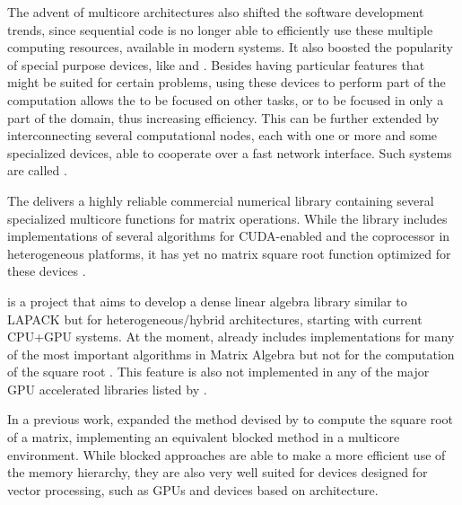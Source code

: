 \documentclass[../thesis]{subfiles}
\begin{document}
	The advent of multicore architectures also shifted the software development trends, since sequential code is no longer able to efficiently use these multiple computing resources, available in modern systems. It also boosted the popularity of special purpose devices, like \gpus and \dsps. Besides having particular features that might be suited for certain problems, using these devices to perform part of the computation allows the \cpu to be focused on other tasks, or to be focused in only a part of the domain, thus increasing efficiency. This can be further extended by interconnecting several computational nodes, each with one or more \cpus and some specialized devices, able to cooperate over a fast network interface. Such systems are called \hetplats.

	The \nag\cite{NAG} delivers a highly reliable commercial numerical library containing several specialized multicore functions for matrix operations. While the \nag library includes implementations of several algorithms for CUDA-enabled \gpus and the \intel\xeonphi coprocessor in heterogeneous platforms, it has yet no matrix square root function optimized for these devices \cite{NAG:GPU:0:6,NAG:MIC}.

	\magma is a project that aims to develop a dense linear algebra library similar to LAPACK but for heterogeneous/hybrid architectures, starting with current CPU+GPU systems. At the moment, \magma already includes implementations for many of the most important algorithms in Matrix Algebra but not for the computation of the square root \cite{PLASMA:MAGMA}. This feature is also not implemented in any of the major GPU accelerated libraries listed by \nvidia \cite{ACCELEREYES:WIKI:SQRTM,CULA:LAPACK,NVIDIA:CUBLAS:5:0,NVIDIA:CUSPARSE:5:0,CUSP:FEATURES}.

	In a previous work,  expanded the method devised by  to compute the square root of a matrix, implementing an equivalent blocked method in a multicore environment. While blocked approaches are able to make a more efficient use of the memory hierarchy, they are also very well suited for devices designed for vector processing, such as \acfp{GPU} and devices based on \intel\mic architecture.

	
	
\end{document}
